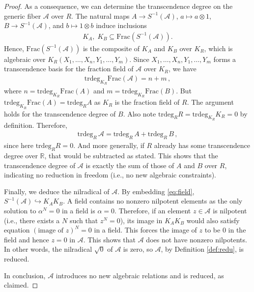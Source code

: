 \documentclass[11pt]{amsart}
\theoremstyle{definition}
\theoremstyle{plain}
\theoremstyle{conclusion}
\begin{document}
\begin{proof}
As a consequence, we can determine the transcendence degree on the generic fiber $\mathcal{A}$ over $R$. The natural maps $A\to S^{-1}(\mathcal{A})$, $a\mapsto a\otimes 1$, $B\to S^{-1}(\mathcal{A})$, and $b\mapsto 1\otimes b$ induce inclusions
\begin{align*}
K_A,\;K_B \subseteq \mathrm{Frac} \left(S^{-1}(\mathcal{A})\right).
\end{align*}
Hence, $\mathrm{Frac} \left(S^{-1}(\mathcal{A})\right)$ is the composite of $K_A$ and $K_B$ over $K_R$, which is algebraic over $K_R(X_1,\ldots,X_n,Y_1,\ldots,Y_m)$. Since ${X_1,\ldots,X_n,Y_1,\ldots,Y_m}$ forms a transcendence basis for the fraction field of $\mathcal{A}$ over $K_R$, we have \begin{align*}
    \mathrm{trdeg}_{K_R} \mathrm{Frac}(\mathcal{A}) = n+m\,,
\end{align*} where $n = \mathrm{trdeg}_{K_R} \mathrm{Frac}(A)$ and $m = \mathrm{trdeg}_{K_R} \mathrm{Frac}(B)$. But $\mathrm{trdeg}_{K_R} \mathrm{Frac}(A) = \mathrm{trdeg}_R A$ as $K_R$ is the fraction field of $R$. The argument holds for the transcendence degree of $B$. Also note $\mathrm{trdeg}_R R = \mathrm{trdeg}_{K_R} K_R = 0$ by definition. Therefore, \begin{align*}
    \mathrm{trdeg}_R \,\mathcal{A}  = \mathrm{trdeg}_R \, A +  \mathrm{trdeg}_R \, B \,,
\end{align*} since here $\mathrm{trdeg}_R R = 0$. And more generally, if $R$ already has some transcendence degree over $\mathbb{R}$, that would be subtracted as stated. This shows that the transcendence degree of $\mathcal{A} $ is exactly the sum of those of $A$ and $B$ over $R$, indicating no reduction in freedom (i.e., no new algebraic constraints).

Finally, we deduce the nilradical of $\mathcal{A}$. By embedding \eqref{eq:field}, $S^{-1}(\mathcal{A})\hookrightarrow K_A K_B$. A field contains no nonzero nilpotent elements as the only solution to $\alpha^N=0$ in a field is $\alpha=0$. Therefore, if an element $z \in \mathcal{A}$ is nilpotent (i.e., there exists a $N$ such that $z^N=0$), its image in $K_AK_B$ would also satisfy equation $(	\text{image of } z)^N = 0$ in a field. This forces the image of $z$ to be $0$ in the field and hence $z=0$ in $\mathcal{A}$. This shows that $\mathcal{A}$ does not have nonzero nilpotents. In other words, the nilradical $\sqrt{0}$ of $\mathcal{A}$ is zero, so $\mathcal{A}$, by Definition \ref{def:redu}, is reduced.  

In conclusion, $\mathcal{A}$ introduces no new algebraic relations and is reduced, as claimed.
 \end{proof}
\end{document}

